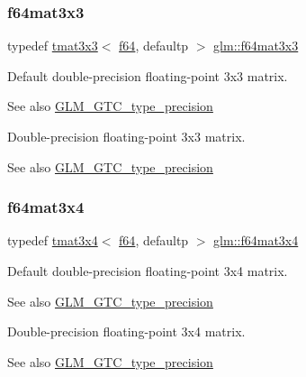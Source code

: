 \subsubsection{\texorpdfstring{f64mat3x3}{f64mat3x3}}
{\footnotesize\ttfamily typedef \hyperlink{structglm_1_1tmat3x3}{tmat3x3}$<$ \hyperlink{group__gtc__type__precision_ga2bba392e555124b36cde6abba349bab3}{f64}, defaultp $>$ \hyperlink{group__gtc__type__precision_gab272e67eb87cc1e8233237480c2aa8d2}{glm\+::f64mat3x3}}

Default double-\/precision floating-\/point 3x3 matrix. \begin{DoxySeeAlso}{See also}
\hyperlink{group__gtc__type__precision}{G\+L\+M\+\_\+\+G\+T\+C\+\_\+type\+\_\+precision}
\end{DoxySeeAlso}
Double-\/precision floating-\/point 3x3 matrix. \begin{DoxySeeAlso}{See also}
\hyperlink{group__gtc__type__precision}{G\+L\+M\+\_\+\+G\+T\+C\+\_\+type\+\_\+precision} 
\end{DoxySeeAlso}
\mbox{\label{group__gtc__type__precision_ga36436dae85fc187d4a20d68c4d660a10}} 
\subsubsection{\texorpdfstring{f64mat3x4}{f64mat3x4}}
{\footnotesize\ttfamily typedef \hyperlink{structglm_1_1tmat3x4}{tmat3x4}$<$ \hyperlink{group__gtc__type__precision_ga2bba392e555124b36cde6abba349bab3}{f64}, defaultp $>$ \hyperlink{group__gtc__type__precision_ga36436dae85fc187d4a20d68c4d660a10}{glm\+::f64mat3x4}}

Default double-\/precision floating-\/point 3x4 matrix. \begin{DoxySeeAlso}{See also}
\hyperlink{group__gtc__type__precision}{G\+L\+M\+\_\+\+G\+T\+C\+\_\+type\+\_\+precision}
\end{DoxySeeAlso}
Double-\/precision floating-\/point 3x4 matrix. \begin{DoxySeeAlso}{See also}
\hyperlink{group__gtc__type__precision}{G\+L\+M\+\_\+\+G\+T\+C\+\_\+type\+\_\+precision} 
\end{DoxySeeAlso}
\mbox{\label{group__gtc__type__precision_ga5bfcfa195cfe908fe50ecc15abbf7979}} 
